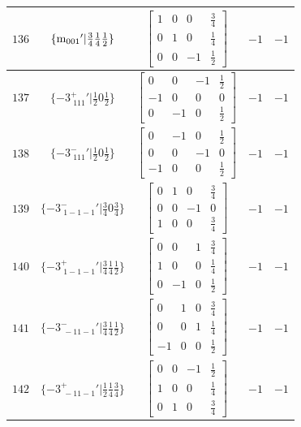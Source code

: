 \documentclass[fleqn,8pt]{jsarticle}
\begin{document}
\begin{longtable}{ccccc}
$ 136 $ & $ \{{\rm m}_{001}{}'|\frac{3}{4} \frac{1}{4} \frac{1}{2}\} $ & $ \begin{bmatrix} 1 & 0 & 0 & \frac{3}{4} \\ 0 & 1 & 0 & \frac{1}{4} \\ 0 & 0 & -1 & \frac{1}{2} \end{bmatrix} $ & $ -1 $ & $ -1 $ \\ \hline
$ 137 $ & $ \{-3^{+}_{\,\,111}{}'|\frac{1}{2} 0 \frac{1}{2}\} $ & $ \begin{bmatrix} 0 & 0 & -1 & \frac{1}{2} \\ -1 & 0 & 0 & 0 \\ 0 & -1 & 0 & \frac{1}{2} \end{bmatrix} $ & $ -1 $ & $ -1 $ \\ \hline
$ 138 $ & $ \{-3^{-}_{\,\,111}{}'|\frac{1}{2} 0 \frac{1}{2}\} $ & $ \begin{bmatrix} 0 & -1 & 0 & \frac{1}{2} \\ 0 & 0 & -1 & 0 \\ -1 & 0 & 0 & \frac{1}{2} \end{bmatrix} $ & $ -1 $ & $ -1 $ \\ \hline
$ 139 $ & $ \{-3^{-}_{\,\,1-1-1}{}'|\frac{3}{4} 0 \frac{3}{4}\} $ & $ \begin{bmatrix} 0 & 1 & 0 & \frac{3}{4} \\ 0 & 0 & -1 & 0 \\ 1 & 0 & 0 & \frac{3}{4} \end{bmatrix} $ & $ -1 $ & $ -1 $ \\ \hline
$ 140 $ & $ \{-3^{+}_{\,\,1-1-1}{}'|\frac{3}{4} \frac{1}{4} \frac{1}{2}\} $ & $ \begin{bmatrix} 0 & 0 & 1 & \frac{3}{4} \\ 1 & 0 & 0 & \frac{1}{4} \\ 0 & -1 & 0 & \frac{1}{2} \end{bmatrix} $ & $ -1 $ & $ -1 $ \\ \hline
$ 141 $ & $ \{-3^{-}_{\,\,-11-1}{}'|\frac{3}{4} \frac{1}{4} \frac{1}{2}\} $ & $ \begin{bmatrix} 0 & 1 & 0 & \frac{3}{4} \\ 0 & 0 & 1 & \frac{1}{4} \\ -1 & 0 & 0 & \frac{1}{2} \end{bmatrix} $ & $ -1 $ & $ -1 $ \\ \hline
$ 142 $ & $ \{-3^{+}_{\,\,-11-1}{}'|\frac{1}{2} \frac{1}{4} \frac{3}{4}\} $ & $ \begin{bmatrix} 0 & 0 & -1 & \frac{1}{2} \\ 1 & 0 & 0 & \frac{1}{4} \\ 0 & 1 & 0 & \frac{3}{4} \end{bmatrix} $ & $ -1 $ & $ -1 $ \\ \hline

\end{longtable}
\end{document}
